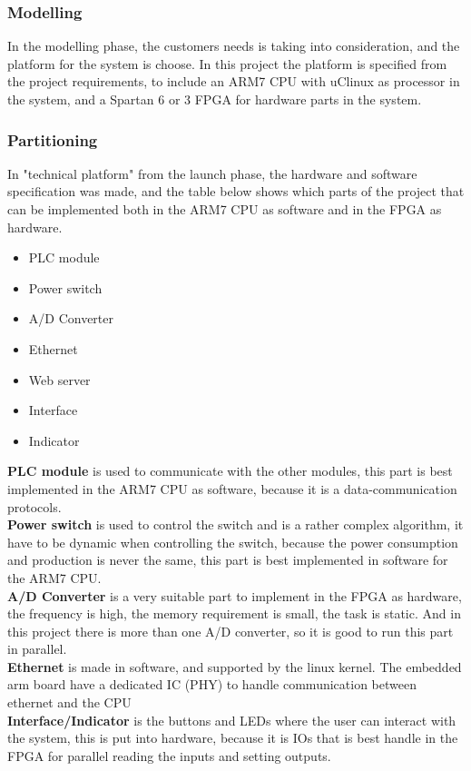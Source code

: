 \subsubsection{Modelling}
In the modelling phase, the customers needs is taking into consideration, and the platform for the system is choose. In this project the platform is specified from the project requirements, to include an ARM7 CPU with uClinux as processor in the system, and a Spartan 6 or 3 FPGA for hardware parts in the system.

\subsubsection{Partitioning}
In "technical platform" from the launch phase, the hardware and software specification was made, and the table below shows which parts of the project that can be implemented both in the ARM7 CPU as software and in the FPGA as hardware.

\begin{itemize}
	\item PLC module
	\item Power switch
	\item A/D Converter
	\item Ethernet
	\item Web server
	\item Interface
	\item Indicator
\end{itemize}
\textbf{PLC module} is used to communicate with the other modules, this part is best implemented in the ARM7 CPU as software, because it is a data-communication protocols.\\
\textbf{Power switch} is used to control the switch and is a rather complex algorithm, it have to be dynamic when controlling the switch, because the power consumption and production is never the same, this part is best implemented in software for the ARM7 CPU.\\
\textbf{A/D Converter} is a very suitable part to implement in the FPGA as hardware, the frequency is high, the memory requirement is small, the task is static. And in this project there is more than one A/D converter, so it is good to run this part in parallel.\\
\textbf{Ethernet} is made in software, and supported by the linux kernel. The embedded arm board have a dedicated IC (PHY) to handle communication between ethernet and the CPU\\
\textbf{Interface/Indicator} is the buttons and LEDs where the user can interact with the system, this is put into hardware, because it is IOs that is best handle in the FPGA for parallel reading the inputs and setting outputs.

